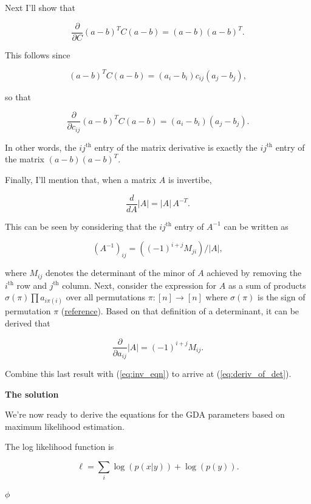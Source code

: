 \documentclass[]{article}
\begin{document}
Next I'll show that

\begin{equation}\frac{\partial}{\partial C}(a-b)^T C (a-b) = (a-b)(a-b)^T.\label{eq:partial_C}\end{equation}

This follows since

\[(a-b)^T C (a-b) = (a_i - b_i) c_{ij} (a_j - b_j),\]

so that

\[\frac{\partial}{\partial c_{ij}} (a-b)^T C (a-b)
= (a_i - b_i)(a_j - b_j).\]

In other words, the \(ij^\text{th}\) entry of the matrix derivative is
exactly the \(ij^\text{th}\) entry of the matrix \((a-b)(a-b)^T.\)

Finally, I'll mention that, when a matrix \(A\) is invertibe,

\begin{equation}\frac{d}{dA} |A| = |A|\,A^{-T}.\label{eq:deriv_of_det}\end{equation}

This can be seen by considering that the \(ij^\text{th}\) entry of
\(A^{-1}\) can be written as

\begin{equation}(A^{-1})_{ij} = ((-1)^{i+j}M_{ji})/|A|,\label{eq:inv_eqn}\end{equation}

where \(M_{ij}\) denotes the determinant of the minor of \(A\) achieved
by removing the \(i^\text{th}\) row and \(j^\text{th}\) column. Next,
consider the expression for \(A\) as a sum of products
\(\sigma(\pi)\prod a_{i\pi(i)}\) over all permutations \(\pi:[n]\to[n]\)
where \(\sigma(\pi)\) is the sign of permutation \(\pi\)
(\href{https://en.wikipedia.org/wiki/Determinant\#n_.C3.97_n_matrices}{reference}).
Based on that definition of a determinant, it can be derived that

\[\frac{\partial}{\partial a_{ij}}|A| = (-1)^{i+j}M_{ij}.\]

Combine this last result with (\ref{eq:inv_eqn}) to arrive at
(\ref{eq:deriv_of_det}).

\textbf{The solution}

We're now ready to derive the equations for the GDA parameters based on
maximum likelihood estimation.

The log likelihood function is

\[\ell = \sum_i \log(p(x|y)) + \log(p(y)).\]

\(\phi\)
\end{document}
